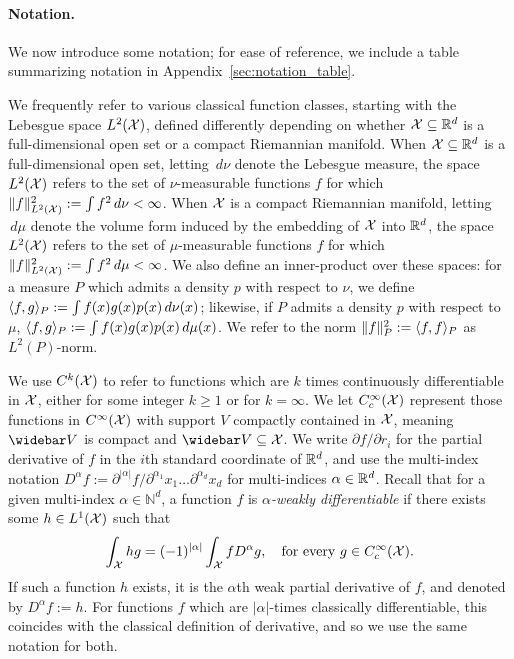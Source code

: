 \paragraph{Notation.}
We now introduce some notation; for ease of reference, we include a table summarizing notation in Appendix~\ref{sec:notation_table}.

We frequently refer to various classical function classes, starting with the Lebesgue space $L^2(\mathcal{X})$, defined differently depending on whether $\mathcal{X} \subseteq \mathbb{R}^d$ is a full-dimensional open set or a compact Riemannian manifold. When $\mathcal{X} \subseteq \mathbb{R}^d$ is a full-dimensional open set, letting $\,d\nu$ denote the Lebesgue measure, the space $L^2(\mathcal{X})$ refers to the set of $\nu$-measurable functions $f$ for which $\|f\|_{L^2(\mathcal{X})}^2 := \int f^2 \,d\nu  < \infty$. When $\mathcal{X}$ is a compact Riemannian manifold, letting $\,d\mu$ denote the volume form induced by the embedding of $\mathcal{X}$ into $\mathbb{R}^d$, the space $L^2(\mathcal{X})$ refers to the set of $\mu$-measurable functions $f$ for which $\|f\|_{L^2(\mathcal{X})}^2 := \int f^2 \,d\mu  < \infty$. We also define an inner-product over these spaces: for a measure $P$ which admits a density $p$ with respect to $\nu$, we define $\langle f, g \rangle_P := \int f(x)g(x)p(x) \,d\nu(x)$; likewise, if $P$ admits a density $p$ with respect to $\mu$, $\langle f, g \rangle_P := \int f(x)g(x)p(x) \,d\mu(x)$. We refer to the norm $\|f\|_P^2 := \langle f, f \rangle_{P}$ as $L^2(P)$-norm.

We use $C^k(\mathcal{X})$ to refer to functions which are $k$ times continuously differentiable in $\mathcal{X}$, either for some integer $k \geq 1$ or for $k = \infty$. We let $C_c^{\infty}(\mathcal{X})$ represent those functions in $C^{\infty}(\mathcal{X})$ with support $V$ compactly contained in $\mathcal{X}$, meaning $\wb{V}$ is compact and $\wb{V} \subseteq \mc{X}$. We write $\partial f/\partial r_i$ for the partial derivative of $f$ in the $i$th standard coordinate of $\mathbb{R}^d$, and use the multi-index notation $D^{\alpha}f := \partial^{|\alpha|}f/\partial^{\alpha_1}x_1\ldots\partial^{\alpha_d}x_d$ for multi-indices $\alpha \in \mathbb{R}^d$. Recall that for a given multi-index $\alpha \in \mathbb{N}^d$, a function $f$ is \emph{$\alpha$-weakly differentiable} if there exists some $h \in L^1(\mathcal{X})$ such that
\begin{equation*}
\int_{\mathcal{X}} h g = (-1)^{|\alpha|} \int_{\mathcal{X}} f D^{\alpha}g, \quad \textrm{for every $g \in C_c^{\infty}(\mathcal{X})$.}
\end{equation*}
If such a function $h$ exists, it is the $\alpha$th weak partial derivative of $f$, and denoted by $D^{\alpha}f := h$. For functions $f$ which are $|\alpha|$-times classically differentiable, this coincides with the classical definition of derivative, and so we use the same notation for both. 

